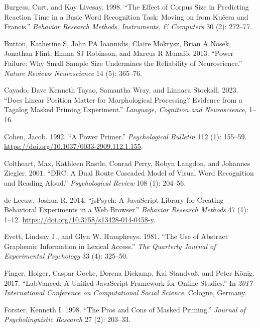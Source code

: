 \documentclass[
]{interact}
\newlength{\cslhangindent}
\newenvironment{CSLReferences}[2] %
 {\begin{list}{}{%
  \setlength{\itemindent}{0pt}
  \setlength{\leftmargin}{0pt}
  \setlength{\parsep}{0pt}
  \ifodd #1
   \setlength{\leftmargin}{\cslhangindent}
   \setlength{\itemindent}{-1\cslhangindent}
  \fi
  \setlength{\itemsep}{#2\baselineskip}}}
 {\end{list}}
\begin{document}
\begin{CSLReferences}{1}{0}
Burgess, Curt, and Kay Livesay. 1998. {``The Effect of Corpus Size in
Predicting Reaction Time in a Basic Word Recognition Task: Moving on
from Ku{č}era and Francis.''} \emph{Behavior Research Methods,
Instruments, \& Computers} 30 (2): 272--77.

Button, Katherine S, John PA Ioannidis, Claire Mokrysz, Brian A Nosek,
Jonathan Flint, Emma SJ Robinson, and Marcus R Munafò. 2013. {``Power
Failure: Why Small Sample Size Undermines the Reliability of
Neuroscience.''} \emph{Nature Reviews Neuroscience} 14 (5): 365--76.

Cayado, Dave Kenneth Tayao, Samantha Wray, and Linnaea Stockall. 2023.
{``Does Linear Position Matter for Morphological Processing? Evidence
from a Tagalog Masked Priming Experiment.''} \emph{Language, Cognition
and Neuroscience}, 1--16.

Cohen, Jacob. 1992. {``A Power Primer.''} \emph{Psychological Bulletin}
112 (1): 155--59. \url{https://doi.org/10.1037/0033-2909.112.1.155}.

Coltheart, Max, Kathleen Rastle, Conrad Perry, Robyn Langdon, and
Johannes Ziegler. 2001. {``DRC: A Dual Route Cascaded Model of Visual
Word Recognition and Reading Aloud.''} \emph{Psychological Review} 108
(1): 204--56.

de Leeuw, Joshua R. 2014. {``jsPsych: A JavaScript Library for Creating
Behavioral Experiments in a Web Browser.''} \emph{Behavior Research
Methods} 47 (1): 1--12. \url{https://doi.org/10.3758/s13428-014-0458-y}.

Evett, Lindsay J., and Glyn W. Humphreys. 1981. {``The Use of Abstract
Graphemic Information in Lexical Access.''} \emph{The Quarterly Journal
of Experimental Psychology} 33 (4): 325--50.

Finger, Holger, Caspar Goeke, Dorena Diekamp, Kai Standvoß, and Peter
König. 2017. {``LabVanced: A Unified JavaScript Framework for Online
Studies.''} In \emph{2017 International Conference on Computational
Social Science}. Cologne, Germany.

Forster, Kenneth I. 1998. {``The Pros and Cons of Masked Priming.''}
\emph{Journal of Psycholinguistic Research} 27 (2): 203--33.


\end{CSLReferences}
\end{document}
